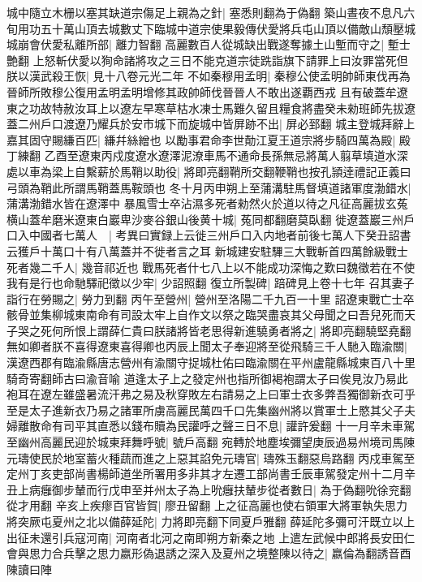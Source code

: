 城中隨立木栅以塞其缺道宗傷足上親為之針|{
	塞悉則翻為于偽翻}
築山晝夜不息凡六旬用功五十萬山頂去城數丈下臨城中道宗使果毅傳伏愛將兵屯山頂以備敵山頹壓城城崩會伏愛私離所部|{
	離力智翻}
高麗數百人從城缺出戰遂奪據土山塹而守之|{
	塹士艶翻}
上怒斬伏愛以狥命諸將攻之三日不能克道宗徒跣詣旗下請罪上曰汝罪當死但朕以漢武殺王恢|{
	見十八卷元光二年}
不如秦穆用孟明|{
	秦穆公使孟明帥師東伐再為晉師所敗穆公復用孟明孟明增修其政帥師伐晉晉人不敢出遂覇西戎}
且有破蓋牟遼東之功故特赦汝耳上以遼左早寒草枯水凍士馬難久留且糧食將盡癸未勑班師先拔遼蓋二州戶口渡遼乃耀兵於安市城下而旋城中皆屏跡不出|{
	屏必郅翻}
城主登城拜辭上嘉其固守賜縑百匹|{
	縑幷絲繒也}
以勵事君命李世勣江夏王道宗將步騎四萬為殿|{
	殿丁練翻}
乙酉至遼東丙戍度遼水遼澤泥潦車馬不通命長孫無忌將萬人翦草填道水深處以車為梁上自繫薪於馬鞘以助役|{
	將即亮翻鞘所交翻鞭鞘也按孔頴逹禮記正義曰弓頭為鞘此所謂馬鞘蓋馬鞍頭也}
冬十月丙申朔上至蒲溝駐馬督填道諸軍度渤錯水|{
	蒲溝渤錯水皆在遼澤中}
暴風雪士卒沾濕多死者勑然火於道以待之凡征高麗拔玄菟横山蓋牟磨米遼東白巖卑沙麥谷銀山後黄十城|{
	菟同都翻磨莫臥翻}
徙遼蓋巖三州戶口入中國者七萬人　|{
	考異曰實録上云徙三州戶口入内地者前後七萬人下癸丑詔書云獲戶十萬口十有八萬蓋并不徙者言之耳}
新城建安駐驆三大戰斬首四萬餘級戰士死者幾二千人|{
	幾音祁近也}
戰馬死者什七八上以不能成功深悔之歎曰魏徵若在不使我有是行也命馳驛祀徵以少牢|{
	少詔照翻}
復立所製碑|{
	踣碑見上卷十七年}
召其妻子詣行在勞賜之|{
	勞力到翻}
丙午至營州|{
	營州至洛陽二千九百一十里}
詔遼東戰亡士卒骸骨並集柳城東南命有司設太牢上自作文以祭之臨哭盡哀其父母聞之曰吾兒死而天子哭之死何所恨上謂薛仁貴曰朕諸將皆老思得新進驍勇者將之|{
	將即亮翻驍堅堯翻}
無如卿者朕不喜得遼東喜得卿也丙辰上聞太子奉迎將至從飛騎三千人馳入臨渝關|{
	漢遼西郡有臨渝縣唐志營州有渝關守捉城杜佑曰臨渝關在平州盧龍縣城東百八十里騎奇寄翻師古曰渝音喻}
道逢太子上之發定州也指所御褐袍謂太子曰俟見汝乃易此袍耳在遼左雖盛暑流汗弗之易及秋穿敗左右請易之上曰軍士衣多弊吾獨御新衣可乎至是太子進新衣乃易之諸軍所虜高麗民萬四千口先集幽州將以賞軍士上愍其父子夫婦離散命有司平其直悉以錢布贖為民讙呼之聲三日不息|{
	讙許爰翻}
十一月辛未車駕至幽州高麗民迎於城東拜舞呼號|{
	號戶高翻}
宛轉於地塵埃彌望庚辰過易州境司馬陳元璹使民於地室蓄火種蔬而進之上惡其諂免元璹官|{
	璹殊玉翻惡烏路翻}
丙戍車駕至定州丁亥吏部尚書楊師道坐所署用多非其才左遷工部尚書壬辰車駕發定州十二月辛丑上病癰御步輦而行戊申至并州太子為上吮癰扶輦步從者數日|{
	為于偽翻吮徐兖翻從才用翻}
辛亥上疾瘳百官皆賀|{
	廖丑留翻}
上之征高麗也使右領軍大將軍執失思力將突厥屯夏州之北以備薛延陀|{
	力將即亮翻下同夏戶雅翻}
薛延陀多彌可汗既立以上出征未還引兵寇河南|{
	河南者北河之南即朔方新秦之地}
上遣左武候中郎將長安田仁會與思力合兵擊之思力嬴形偽退誘之深入及夏州之境整陳以待之|{
	嬴倫為翻誘音酉陳讀曰陣}
